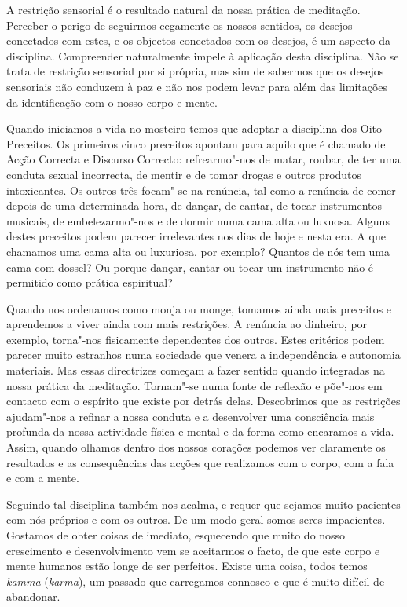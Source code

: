 A restrição sensorial é o resultado natural da nossa prática de
meditação. Perceber o perigo de seguirmos cegamente os nossos sentidos,
os desejos conectados com estes, e os objectos conectados com os
desejos, é um aspecto da disciplina. Compreender naturalmente impele à
aplicação desta disciplina. Não se trata de restrição sensorial por si
própria, mas sim de sabermos que os desejos sensoriais não conduzem à
paz e não nos podem levar para além das limitações da identificação com
o nosso corpo e mente.

Quando iniciamos a vida no mosteiro temos que adoptar a disciplina dos
Oito Preceitos. Os primeiros cinco preceitos apontam para aquilo que é
chamado de Acção Correcta e Discurso Correcto: refrearmo"-nos de matar,
roubar, de ter uma conduta sexual incorrecta, de mentir e de tomar
drogas e outros produtos intoxicantes. Os outros três focam"-se na
renúncia, tal como a renúncia de comer depois de uma determinada hora,
de dançar, de cantar, de tocar instrumentos musicais, de embelezarmo"-nos
e de dormir numa cama alta ou luxuosa. Alguns destes preceitos podem
parecer irrelevantes nos dias de hoje e nesta era. A que chamamos uma
cama alta ou luxuriosa, por exemplo? Quantos de nós tem uma cama com
dossel? Ou porque dançar, cantar ou tocar um instrumento não é permitido
como prática espiritual?

Quando nos ordenamos como monja ou monge, tomamos ainda mais preceitos e
aprendemos a viver ainda com mais restrições. A renúncia ao dinheiro,
por exemplo, torna"-nos fisicamente dependentes dos outros. Estes
critérios podem parecer muito estranhos numa sociedade que venera a
independência e autonomia materiais. Mas essas directrizes começam a
fazer sentido quando integradas na nossa prática da meditação. Tornam"-se
numa fonte de reflexão e põe"-nos em contacto com o espírito que existe
por detrás delas. Descobrimos que as restrições ajudam"-nos a refinar a
nossa conduta e a desenvolver uma consciência mais profunda da nossa
actividade física e mental e da forma como encaramos a vida. Assim,
quando olhamos dentro dos nossos corações podemos ver claramente os
resultados e as consequências das acções que realizamos com o corpo, com
a fala e com a mente.

Seguindo tal disciplina também nos acalma, e requer que sejamos muito
pacientes com nós próprios e com os outros. De um modo geral somos seres
impacientes. Gostamos de obter coisas de imediato, esquecendo que muito
do nosso crescimento e desenvolvimento vem se aceitarmos o facto, de que
este corpo e mente humanos estão longe de ser perfeitos. Existe uma
coisa, todos temos \emph{kamma} (\emph{karma}), um passado que
carregamos connosco e que é muito difícil de abandonar.

